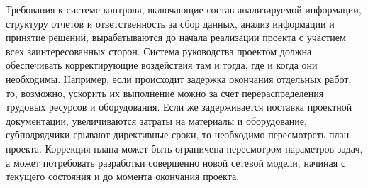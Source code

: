 Требования к системе контроля, включающие состав анализируемой информации, структуру отчетов и ответственность за сбор данных, анализ информации и принятие решений, вырабатываются до начала реализации проекта с участием всех заинтересованных сторон.
Система руководства проектом должна обеспечивать корректирующие воздействия там и тогда, где и когда они необходимы.
Например, если происходит задержка окончания отдельных работ, то, возможно, ускорить их выполнение можно за счет перераспределения трудовых ресурсов и оборудования.
Если же задерживается поставка проектной документации, увеличиваются затраты на материалы и оборудование, субподрядчики срывают директивные сроки, то необходимо пересмотреть план проекта.
Коррекция плана может быть ограничена пересмотром параметров задач, а может потребовать разработки совершенно новой сетевой модели, начиная с текущего состояния и до момента окончания проекта.

